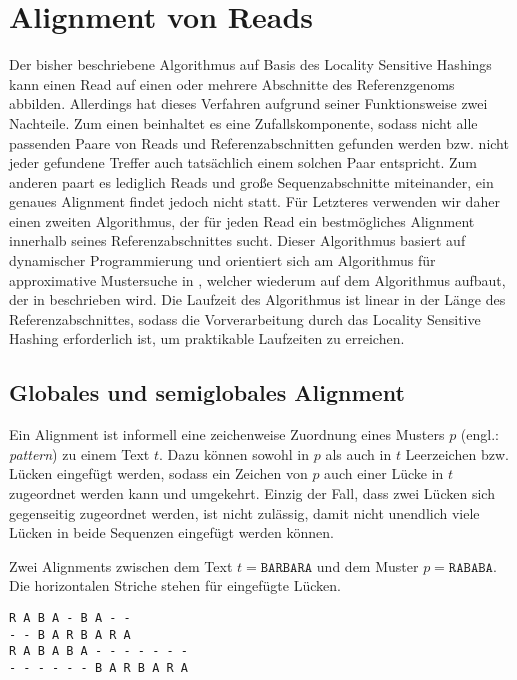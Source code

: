 \chapter{Alignment von Reads}
\label{sec:align}

Der bisher beschriebene Algorithmus auf Basis des Locality Sensitive Hashings kann einen Read auf einen oder mehrere Abschnitte des Referenzgenoms abbilden. Allerdings hat dieses Verfahren aufgrund seiner Funktionsweise zwei Nachteile. Zum einen beinhaltet es eine Zufallskomponente, sodass nicht alle passenden Paare von Reads und Referenzabschnitten gefunden werden bzw. nicht jeder gefundene Treffer auch tatsächlich einem solchen Paar entspricht. Zum anderen paart es lediglich Reads und große Sequenzabschnitte miteinander, ein genaues Alignment findet jedoch nicht statt. Für Letzteres verwenden wir daher einen zweiten Algorithmus, der für jeden Read ein bestmögliches Alignment innerhalb seines Referenzabschnittes sucht. Dieser Algorithmus basiert auf dynamischer Programmierung und orientiert sich am Algorithmus für approximative Mustersuche in \citep{Rahmann2013}, welcher wiederum auf dem Algorithmus aufbaut, der in \citep{Ukkonen1985} beschrieben wird. Die Laufzeit des Algorithmus ist linear in der Länge des Referenzabschnittes, sodass die Vorverarbeitung durch das Locality Sensitive Hashing erforderlich ist, um praktikable Laufzeiten zu erreichen.

\section{Globales und semiglobales Alignment}
\label{sec:align:basics}

Ein Alignment ist informell eine zeichenweise Zuordnung eines Musters $p$ (engl.: \textit{pattern}) zu einem Text $t$. Dazu können sowohl in $p$ als auch in $t$ Leerzeichen bzw. Lücken eingefügt werden, sodass ein Zeichen von $p$ auch einer Lücke in $t$ zugeordnet werden kann und umgekehrt. Einzig der Fall, dass zwei Lücken sich gegenseitig zugeordnet werden, ist nicht zulässig, damit nicht unendlich viele Lücken in beide Sequenzen eingefügt werden können.

\begin{beispiel}
\label{bsp:align:basics:alignment}
Zwei Alignments zwischen dem Text $t = \texttt{BARBARA}$ und dem Muster $p = \texttt{RABABA}$. Die horizontalen Striche stehen für eingefügte Lücken.

\begin{multicols}{2}
\texttt{R A B A - B A - -}\\
\texttt{- - B A R B A R A}\\

\texttt{R A B A B A - - - - - - -}\\
\texttt{- - - - - - B A R B A R A}\\
\end{multicols}
\end{beispiel}

